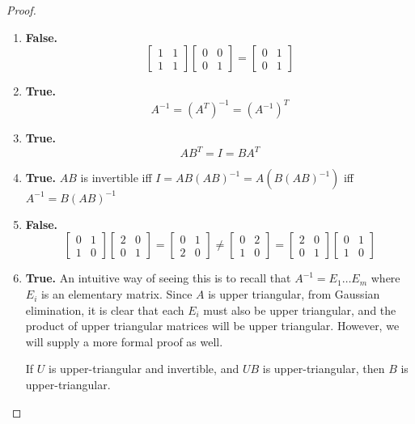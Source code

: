 \begin{exercise}
\begin{proof}
\begin{enumerate}
            \item \textbf{False.}
            \[ \begin{bmatrix} 1 & 1 \\ 1 & 1 \end{bmatrix} \begin{bmatrix} 0 & 0 \\ 0 & 1 \end{bmatrix} = \begin{bmatrix} 0 & 1 \\ 0 & 1 \end{bmatrix}\]
            
            \item \textbf{True.}
            \[ A^{-1} = (A^T)^{-1} = (A^{-1})^T \]
            
            \item \textbf{True.}
            \[ AB^T = I = BA^T \]
            
            \item \textbf{True.} \( AB \) is invertible iff \( I = AB(AB)^{-1} = A(B(AB)^{-1}) \) iff \( A^{-1} = B(AB)^{-1} \)
            
            \item \textbf{False.}
            \[ \begin{bmatrix} 0 & 1 \\ 1 & 0 \end{bmatrix} \begin{bmatrix} 2 & 0 \\ 0 & 1 \end{bmatrix} = \begin{bmatrix} 0 & 1 \\ 2 & 0 \end{bmatrix} \neq \begin{bmatrix} 0 & 2 \\ 1 & 0 \end{bmatrix} = \begin{bmatrix} 2 & 0 \\ 0 & 1 \end{bmatrix}  \begin{bmatrix} 0 & 1 \\ 1 & 0 \end{bmatrix}\]
            
            \item \textbf{True.} An intuitive way of seeing this is to recall that \( A^{-1} = E_1 \ldots E_m \) where \( E_i \) is an elementary matrix. Since \( A \) is upper triangular, from Gaussian elimination, it is clear that each \( E_i \) must also be upper triangular, and the product of upper triangular matrices will be upper triangular. However, we will supply a more formal proof as well.
            \begin{lemma}
                If \( U \) is upper-triangular and invertible, and \( UB \) is upper-triangular, then \( B \) is upper-triangular.
            \end{lemma}
            

\end{enumerate}
\end{proof}
\end{exercise}
